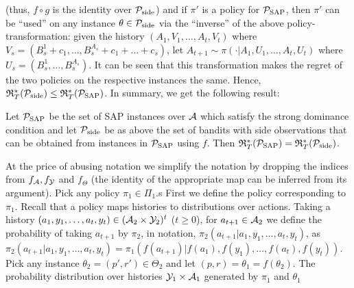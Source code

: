 (thus, $f\circ g$ is the identity over $\mathcal{P}_{\mathrm{side}}$)
and if $\pi'$ is a policy for $\mathcal{P}_{\mathrm{SAP}}$, 
then $\pi'$ can be ``used''  on any instance $\theta\in \mathcal{P}_{\mathrm{side}}$
via the ``inverse'' of the above policy-transformation:
given the history $(A_1,V_1,\dots,A_t,V_t)$ where $V_s
= (B_s^1+c_1,\dots,B_ s^{A_s}+c_1+\dots+c_s)$,
let $A_{t+1} \sim \pi( \cdot| A_1,U_1,\dots,A_t,U_t)$ where
$U_s = (B_s^1,\dots,B_s^{A_s})$.
It can be seen that this transformation makes the regret of the two policies
on the respective instances the same.
Hence, $\mathfrak{R}_T^*(\mathcal{P}_{\mathrm{side}})\le \mathfrak{R}_T^*(\mathcal{P}_{\mathrm{SAP}})$.
In summary, we get the following result:
\begin{proposition}
Let $\mathcal{P}_{\mathrm{SAP}}$ be the set of SAP instances over $\mathcal{A}$ which satisfy the strong 
dominance condition
and let $\mathcal{P}_{\mathrm{side}}$ be as above the set of bandits with side observations that 
can be obtained from instances in $\mathcal{P}_{\mathrm{SAP}}$ using $f$.
Then $\mathfrak{R}_T^*(\mathcal{P}_{\mathrm{SAP}}) = \mathfrak{R}_T^*(\mathcal{P}_{\mathrm{side}})$. 
\end{proposition}

At the price of abusing notation 
we simplify the notation by dropping the indices from $f_{\mathcal{A}}, f_{\mathcal{Y}}$ and $f_{\Theta}$ (the identity of the appropriate map can be inferred from its argument).
Pick any policy $\pi_1\in \Pi_1$.s
First we define the policy corresponding to $\pi_1$.
Recall that a policy maps histories to distributions over actions.
Taking a history $(a_1,y_1,\dots,a_t,y_t)\in (\mathcal{A}_2\times \mathcal{Y}_2)^t$ ($t\ge 0$),
for $a_{t+1}\in \mathcal{A}_2$ we define the probability of taking $a_{t+1}$ by $\pi_2$, in notation,
 $\pi_2(a_{t+1}|a_1,y_1,\dots,a_t,y_t)$, as
 $\pi_2(a_{t+1}|a_1,y_1,\dots,a_t,y_t) = \pi_1(f(a_{t+1})|f(a_1),f(y_1),\dots,f(a_t),f(y_t))$.
Pick any instance $\theta_2 = (p',r')\in \Theta_2$ and let $(p,r) = \theta_1  = f( \theta_2)$.
The probability distribution over histories $\mathcal{Y}_1 \times \mathcal{A}_1$ generated by $\pi_1$ and $\theta_1$
\fi



